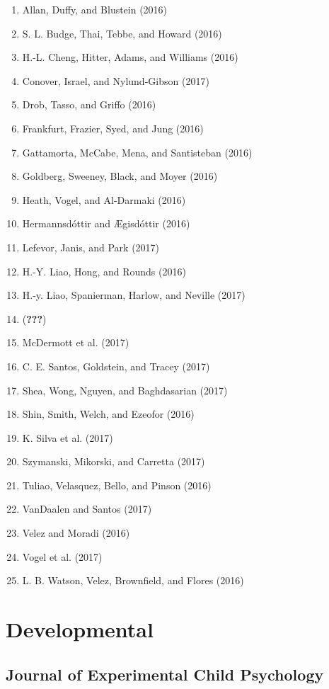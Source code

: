 \documentclass[english,man]{apa6}
\providecommand{\tightlist}{%
  \setlength{\itemsep}{0pt}\setlength{\parskip}{0pt}}
\theoremstyle{definition}
\theoremstyle{definition}
\theoremstyle{definition}
\theoremstyle{remark}
\begin{document}
\begin{enumerate}
\def\labelenumi{\arabic{enumi})}
\tightlist
\item
  Allan, Duffy, and Blustein (2016)
\item
  S. L. Budge, Thai, Tebbe, and Howard (2016)
\item
  H.-L. Cheng, Hitter, Adams, and Williams (2016)
\item
  Conover, Israel, and Nylund-Gibson (2017)
\item
  Drob, Tasso, and Griffo (2016)
\item
  Frankfurt, Frazier, Syed, and Jung (2016)
\item
  Gattamorta, McCabe, Mena, and Santisteban (2016)
\item
  Goldberg, Sweeney, Black, and Moyer (2016)
\item
  Heath, Vogel, and Al-Darmaki (2016)
\item
  Hermannsdóttir and Ægisdóttir (2016)
\item
  Lefevor, Janis, and Park (2017)
\item
  H.-Y. Liao, Hong, and Rounds (2016)
\item
  H.-y. Liao, Spanierman, Harlow, and Neville (2017)
\item
  ({\textbf{???}})
\item
  McDermott et al. (2017)
\item
  C. E. Santos, Goldstein, and Tracey (2017)
\item
  Shea, Wong, Nguyen, and Baghdasarian (2017)
\item
  Shin, Smith, Welch, and Ezeofor (2016)
\item
  K. Silva et al. (2017)
\item
  Szymanski, Mikorski, and Carretta (2017)
\item
  Tuliao, Velasquez, Bello, and Pinson (2016)
\item
  VanDaalen and Santos (2017)
\item
  Velez and Moradi (2016)
\item
  Vogel et al. (2017)
\item
  L. B. Watson, Velez, Brownfield, and Flores (2016)
\end{enumerate}

\section{Developmental}\label{developmental}

\subsection{Journal of Experimental Child
Psychology}\label{journal-of-experimental-child-psychology}
\end{document}

